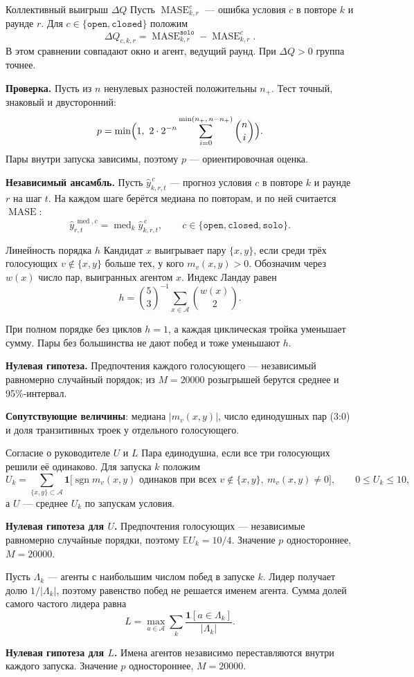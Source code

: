 \documentclass[aspectratio=169,11pt]{beamer}
\DeclareMathOperator{\sgn}{sgn}
\DeclareMathOperator{\MASE}{MASE}
\DeclareMathOperator{\med}{med}
\newcommand{\ind}{\mathbf 1}
\begin{document}
\begin{frame}{Коллективный выигрыш $\Delta Q$}
\small Пусть $\MASE^{c}_{k,r}$ --- ошибка условия $c$ в повторе $k$ и раунде $r$. Для $c\in\{\texttt{open},\texttt{closed}\}$ положим
\[\Delta Q_{c,k,r}=\MASE^{\texttt{solo}}_{k,r}-\MASE^{c}_{k,r}.\]
В этом сравнении совпадают окно и агент, ведущий раунд. При $\Delta Q>0$ группа точнее.

\medskip
\textbf{Проверка.} Пусть из $n$ ненулевых разностей положительны $n_+$. Тест точный, знаковый и двусторонний:
\[p=\min\Bigl(1,\ 2\cdot 2^{-n}\sum_{i=0}^{\min(n_+,\,n-n_+)}\binom ni\Bigr).\]
Пары внутри запуска зависимы, поэтому $p$ --- ориентировочная оценка.

\medskip
\textbf{Независимый ансамбль.} Пусть $\hat y^{\,c}_{k,r,t}$ --- прогноз условия $c$ в повторе $k$ и раунде $r$ на шаг $t$. На каждом шаге берётся медиана по повторам, и по ней считается $\MASE$:
\[\hat y^{\,\med,c}_{r,t}=\med_{k}\hat y^{\,c}_{k,r,t},\qquad c\in\{\texttt{open},\texttt{closed},\texttt{solo}\}.\]
\end{frame}

\begin{frame}{Линейность порядка $h$}
\small Кандидат $x$ выигрывает пару $\{x,y\}$, если среди трёх голосующих $v\notin\{x,y\}$ больше тех, у кого $m_v(x,y)>0$. Обозначим через $w(x)$ число пар, выигранных агентом $x$. Индекс Ландау равен
\[h=\binom{5}{3}^{-1}\sum_{x\in\mathcal A}\binom{w(x)}{2}.\]

При полном порядке без циклов $h=1$, а каждая циклическая тройка уменьшает сумму. Пары без большинства не дают побед и тоже уменьшают $h$.

\medskip
\textbf{Нулевая гипотеза.} Предпочтения каждого голосующего --- независимый равномерно случайный порядок; из $M=20000$ розыгрышей берутся среднее и 95\%-интервал.

\medskip
\textbf{Сопутствующие величины}: медиана $\lvert m_v(x,y)\rvert$, число единодушных пар (3:0) и доля транзитивных троек у отдельного голосующего.
\end{frame}

\begin{frame}{Согласие о руководителе $U$ и $L$}
\small Пара единодушна, если все три голосующих решили её одинаково. Для запуска $k$ положим
\[U_k=\sum_{\{x,y\}\subset\mathcal A}\ind\bigl[\sgn m_v(x,y)\text{ одинаков при всех }v\notin\{x,y\},\ m_v(x,y)\ne 0\bigr],\qquad 0\le U_k\le 10,\]
а $U$ --- среднее $U_k$ по запускам условия.

\textbf{Нулевая гипотеза для $U$.} Предпочтения голосующих --- независимые равномерно случайные порядки, поэтому $\mathbb E U_k=10/4$. Значение $p$ одностороннее, $M=20000$.

\medskip
Пусть $\Lambda_k$ --- агенты с наибольшим числом побед в запуске $k$. Лидер получает долю $1/\lvert\Lambda_k\rvert$, поэтому равенство побед не решается именем агента. Сумма долей самого частого лидера равна
\[L=\max_{a\in\mathcal A}\sum_{k}\frac{\ind[a\in\Lambda_k]}{\lvert\Lambda_k\rvert}.\]

\textbf{Нулевая гипотеза для $L$.} Имена агентов независимо переставляются внутри каждого запуска. Значение $p$ одностороннее, $M=20000$.
\end{frame}
\end{document}
